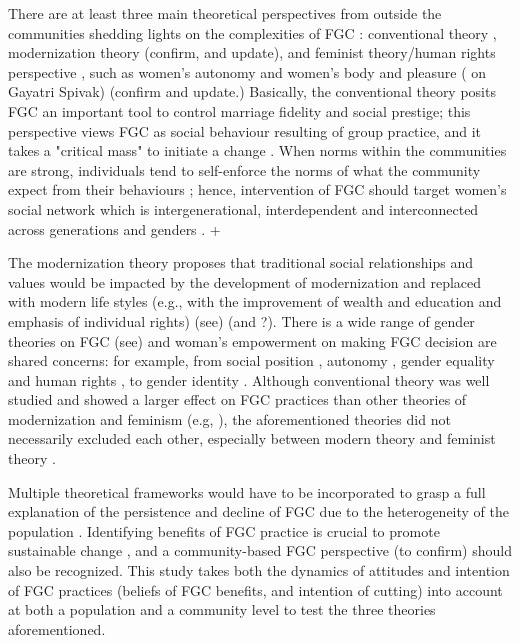 \documentclass[12pt,]{article}
\begin{document}
There are at least three main theoretical perspectives from outside the communities
shedding lights on the complexities of FGC \cite{Hayf05, Youn02}:  conventional theory \cite{Mack96, Mack00, Mack06, MackLeJe09, DuncWand11}, modernization theory\cite{BoylMcMo02, Youn02} (confirm, and update), and feminist theory/human rights perspective \cite{Dell04, FrieMahm13,KhosBane17, Lewi95, Lewi09, Meye00, Morr08, Njam04, UNIC16, YirgKass12, Youn02}, such as women's autonomy \cite{Meye00} and women's body and pleasure (\cite{Morr08} on Gayatri Spivak) (confirm and update.)  Basically, the conventional theory posits FGC an important tool to control marriage fidelity and social prestige; this perspective views FGC as social behaviour resulting of group practice, and it takes a "critical mass" to initiate a change \cite{Mack00, MackLeJe09}.  When norms within the communities are strong, individuals tend to self-enforce the norms of what the community expect from their behaviours \cite{Ajze02, Hayf05, KandNwak09, Mack96, Mack06, MackLeJe09, ThomMadd92}; hence, intervention of FGC should target women's social network which is intergenerational, interdependent and interconnected across generations and genders \cite{Mack00, DuncWand11}.
+ \cite{Shel-Wand11}

The modernization theory proposes that traditional social relationships and values would be impacted by the development of modernization and replaced with modern life styles (e.g., with the improvement of wealth and education and emphasis of individual rights) (see\cite{Moor13}) (and \cite{BoylMcMo02, Youn02}?).  There is a wide range of gender theories on FGC (see\cite{Anti13, Hodg11, Lewi95}) and woman’s empowerment on making FGC decision are shared concerns:  for example, from social position \cite{VanMeek15}, autonomy \cite{Meye00}, gender equality and human rights \cite{Drol11}, to gender identity \cite{Youn04, Koom14, WintKoom09}.  Although conventional theory was well studied and showed a larger effect on FGC practices than other theories of modernization and feminism (e.g, \cite{BoylMcMo02, BoylCorl10, FreyJohn07, FrieMahm13, Hayf05, KandMwek09, Mack96, Mack06, ReigGonz14, YirgKass12}), the aforementioned theories did not necessarily excluded each other, especially between modern theory and feminist theory \cite{Hayf05}.

Multiple theoretical frameworks would have to be incorporated to grasp a full explanation of the persistence and decline of FGC due to the heterogeneity of the population \cite{Hayf05, EffeVogt15, ModrLiu13}.  Identifying benefits of FGC practice is crucial to promote sustainable change \cite{EffeVogt15}, and a community-based FGC perspective \cite{BoylCorl010, Drol11,Hayf05, Grue05, Hodg11, KandNwak09, OdukAfol17} (to confirm) should also be recognized.  This study takes both the dynamics of attitudes and intention of FGC practices (beliefs of FGC benefits, and intention of cutting) into account at both a population and a community level to test the three theories aforementioned.
\end{document}
